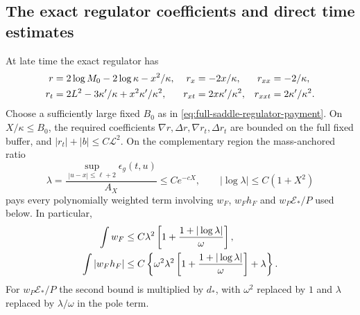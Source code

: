 \subsection{The exact regulator coefficients and direct time estimates}
\begin{lemma}
\label{lem:positive-regulator-payment}
At late time the exact regulator has
\begin{align}
 r&=2\log M_0-2\log\kappa-x^2/\kappa,&
 r_x&=-2x/\kappa,& r_{xx}&=-2/\kappa,\notag\\
 r_t&=2L^2-3\kappa'/\kappa+x^2\kappa'/\kappa^2,&
 r_{xt}&=2x\kappa'/\kappa^2,& r_{xxt}&=2\kappa'/\kappa^2.
 \label{eq:positive-exact-regulator-jets}
\end{align}
Choose a sufficiently large fixed $B_0$ as in
\eqref{eq:full-saddle-regulator-payment}.
On $X/\kappa\le B_0$, the required coefficients
$\nabla r,\Delta r,\nabla r_t,\Delta r_t$ are bounded on the full
fixed buffer, and $|r_t|+|b|\le C\mathcal L^2$.
On the complementary region the mass-anchored ratio
\begin{equation}
 \lambda=\frac{\sup_{|u-x|\le\ell+2}\epsilon_g(t,u)}{A_X}
 \le Ce^{-cX},\qquad |\log\lambda|\le C(1+X^2)
 \label{eq:positive-tail-ratio}
\end{equation}
pays every polynomially weighted term involving $w_F$, $w_Fh_F$
and $w_P\mathcal E_*/P$ used below. In particular,
\begin{align}
 \int w_F&\le C\lambda^2
                \left[1+\frac{1+|\log\lambda|}{\omega}\right],\notag\\
 \int|w_Fh_F|&\le C\left\{
  \omega^2\lambda^2\left[1+\frac{1+|\log\lambda|}{\omega}\right]
                      +\lambda\right\}.
 \label{eq:positive-tail-pole-integrals}
\end{align}
For $w_P\mathcal E_*/P$ the second bound is multiplied by $d_*$,
with $\omega^2$ replaced by $1$ and $\lambda$ replaced by
$\lambda/\omega$ in the pole term.
\end{lemma}
